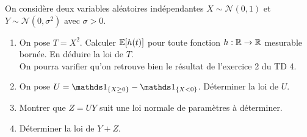 \begin{td-exo}[] %
    On considère deux variables aléatoires indépendantes
    \(X \sim \mathcal N(0,1)\) et \(Y \sim \mathcal N(0,\sigma^2)\)
    avec \(\sigma > 0\). 
    \begin{enumerate}
        \item On pose \(T = X^2\). Calculer \(\mathbb{E}\mathopen{}\left[h(t)\right]\mathclose{}\) pour
        toute fonction \(h: \mathbb{R} \to \mathbb{R}\) mesurable bornée.
        En déduire la loi de \(T\).\\
        On pourra varifier qu'on retrouve bien le résultat de
        l'exercice 2 du TD 4.

        \item On pose \(U = \one_{\{X \geq 0\}} - \one_{\{X < 0\}}\).
        Déterminer la loi de \(U\).

        \item Montrer que \(Z=UY\) suit une loi normale de paramètres
        à déterminer.

        \item Déterminer la loi de \(Y+Z\).
    \end{enumerate}
\end{td-exo}
